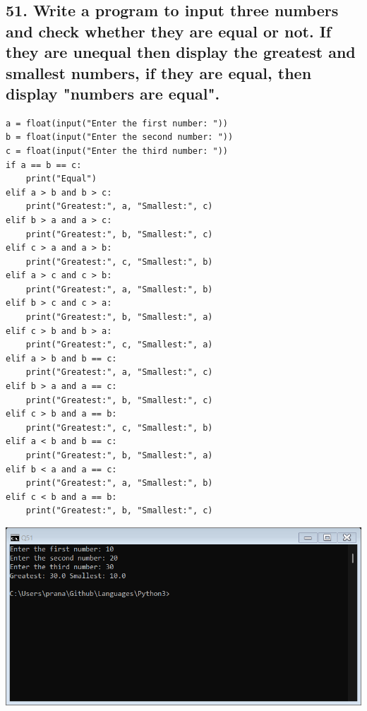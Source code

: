 \documentclass[12pt]{article}
\begin{document}
\subsection*{51. Write a program to input three numbers and check whether they are equal or not. If they are unequal then display the greatest and smallest numbers, if they are equal, then display "numbers are equal".}
\begin{verbatim}
a = float(input("Enter the first number: "))
b = float(input("Enter the second number: "))
c = float(input("Enter the third number: "))
if a == b == c:
    print("Equal")
elif a > b and b > c:
    print("Greatest:", a, "Smallest:", c)
elif b > a and a > c:
    print("Greatest:", b, "Smallest:", c)
elif c > a and a > b:
    print("Greatest:", c, "Smallest:", b)
elif a > c and c > b:
    print("Greatest:", a, "Smallest:", b)
elif b > c and c > a:
    print("Greatest:", b, "Smallest:", a)
elif c > b and b > a:
    print("Greatest:", c, "Smallest:", a)
elif a > b and b == c:
    print("Greatest:", a, "Smallest:", c)
elif b > a and a == c:
    print("Greatest:", b, "Smallest:", c)
elif c > b and a == b:
    print("Greatest:", c, "Smallest:", b)
elif a < b and b == c:
    print("Greatest:", b, "Smallest:", a)
elif b < a and a == c:
    print("Greatest:", a, "Smallest:", b)
elif c < b and a == b:
    print("Greatest:", b, "Smallest:", c)
\end{verbatim}
\includegraphics[width=\linewidth]{images/51.png}
\end{document}
